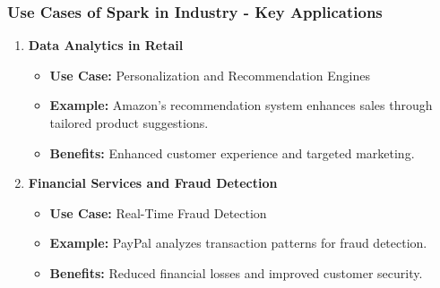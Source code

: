\documentclass[aspectratio=169]{beamer}
\begin{document}
\begin{frame}[fragile]
    \frametitle{Use Cases of Spark in Industry - Key Applications}
    \begin{enumerate}
        \item \textbf{Data Analytics in Retail}
            \begin{itemize}
                \item \textbf{Use Case:} Personalization and Recommendation Engines
                \item \textbf{Example:} Amazon's recommendation system enhances sales through tailored product suggestions.
                \item \textbf{Benefits:} Enhanced customer experience and targeted marketing.
            \end{itemize}
        
        \item \textbf{Financial Services and Fraud Detection}
            \begin{itemize}
                \item \textbf{Use Case:} Real-Time Fraud Detection
                \item \textbf{Example:} PayPal analyzes transaction patterns for fraud detection.
                \item \textbf{Benefits:} Reduced financial losses and improved customer security.
            \end{itemize}
    \end{enumerate}
\end{frame}
\end{document}
